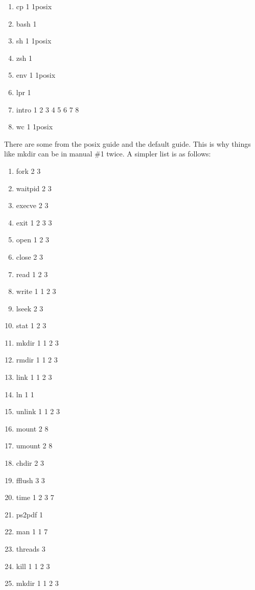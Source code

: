 \documentclass[12pt]{extarticle}
\begin{document}
\begin{enumerate}
\begin{multicols}{3}
\begin{enumerate}
					\item[] cp 1 1posix 
					\item[] bash 1 
					\item[] sh 1 1posix 
					\item[] zsh 1 
					\item[] env 1 1posix 
					\item[] lpr 1 
					\item[] intro 1 2 3 4 5 6 7 8 
					\item[] wc 1 1posix 
				\end{enumerate}
			\end{multicols}
			\noindent\makebox[\linewidth]{\rule{\paperwidth}{0.4pt}}
			There are some from the posix guide and the default guide.  This is why things like mkdir can be in manual \#1 twice.  A simpler list is as follows:\\
			\begin{multicols}{3}
				\begin{enumerate}
					\item[] fork 2 3 
					\item[] waitpid 2 3 
					\item[] execve 2 3 
					\item[] exit 1 2 3 3 
					\item[] open 1 2 3 
					\item[] close 2 3 
					\item[] read 1 2 3 
					\item[] write 1 1 2 3 
					\item[] lseek 2 3 
					\item[] stat 1 2 3 
					\item[] mkdir 1 1 2 3 
					\item[] rmdir 1 1 2 3 
					\item[] link 1 1 2 3 
					\item[] ln 1 1 
					\item[] unlink 1 1 2 3 
					\item[] mount 2 8 
					\item[] umount 2 8 
					\item[] chdir 2 3 
					\item[] fflush 3 3 
					\item[] time 1 2 3 7 
					\item[] ps2pdf 1 
					\item[] man 1 1 7 
					\item[] threads 3 
					\item[] kill 1 1 2 3 
					\item[] mkdir 1 1 2 3 

\end{enumerate}
\end{multicols}
\end{enumerate}
\end{document}
